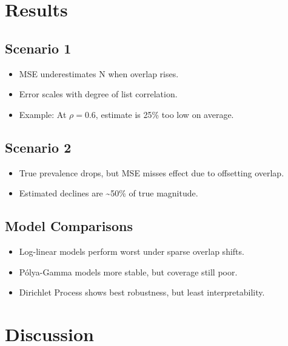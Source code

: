 \documentclass[
  12pt,
]{article}
\providecommand{\tightlist}{%
  \setlength{\itemsep}{0pt}\setlength{\parskip}{0pt}}\usepackage{longtable,booktabs,array}
\theoremstyle{plain}
\theoremstyle{definition}
\begin{document}
\section{Results}\label{results}

\subsection{Scenario 1}\label{scenario-1}

\begin{itemize}
\tightlist
\item
  MSE underestimates N when overlap rises.\\
\item
  Error scales with degree of list correlation.\\
\item
  Example: At \(\rho = 0.6\), estimate is 25\% too low on average.
\end{itemize}

\subsection{Scenario 2}\label{scenario-2}

\begin{itemize}
\tightlist
\item
  True prevalence drops, but MSE misses effect due to offsetting
  overlap.\\
\item
  Estimated declines are \textasciitilde50\% of true magnitude.
\end{itemize}

\subsection{Model Comparisons}\label{model-comparisons}

\begin{itemize}
\tightlist
\item
  Log-linear models perform worst under sparse overlap shifts.\\
\item
  Pólya-Gamma models more stable, but coverage still poor.\\
\item
  Dirichlet Process shows best robustness, but least interpretability.
\end{itemize}

\section{Discussion}\label{discussion}
\end{document}
